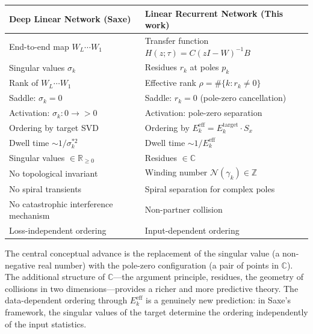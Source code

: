 \documentclass[11pt,a4paper]{article}
\theoremstyle{definition}
\newcommand{\C}{\mathbb{C}}
\newcommand{\R}{\mathbb{R}}
\newcommand{\Z}{\mathbb{Z}}
\newcommand{\cN}{\mathcal{N}}
\begin{document}
\medskip
\begin{center}
\renewcommand{\arraystretch}{1.4}
\begin{tabular}{@{}p{}p{}@{}}
\hline
\textbf{Deep Linear Network (Saxe)} &
\textbf{Linear Recurrent Network (This work)} \\
\hline
End-to-end map $W_L\cdots W_1$ &
Transfer function $H(z;\tau) = C(zI-W)^{-1}B$ \\
Singular values $\sigma_k$ &
Residues $r_k$ at poles $p_k$ \\
Rank of $W_L\cdots W_1$ &
Effective rank $\rho = \#\{k:r_k\neq 0\}$ \\
Saddle: $\sigma_k = 0$ &
Saddle: $r_k = 0$ (pole-zero cancellation) \\
Activation: $\sigma_k: 0 \to {>}0$ &
Activation: pole-zero separation \\
Ordering by target SVD &
Ordering by $E_k^{\mathrm{eff}} = E_k^{\mathrm{target}}\cdot S_x$ \\
Dwell time $\sim 1/\sigma_k^{*2}$ &
Dwell time $\sim 1/E_k^{\mathrm{eff}}$ \\
Singular values $\in \R_{\ge 0}$ &
Residues $\in \C$ \\
No topological invariant &
Winding number $\cN(\gamma_k) \in \Z$ \\
No spiral transients &
Spiral separation for complex poles \\
No catastrophic interference mechanism &
Non-partner collision \\
Loss-independent ordering &
Input-dependent ordering \\
\hline
\end{tabular}
\end{center}

\medskip

\noindent
The central conceptual advance is the replacement of the singular
value (a non-negative real number) with the pole-zero configuration
(a pair of points in $\C$). The additional structure of
$\C$---the argument principle, residues, the geometry of
collisions in two dimensions---provides a richer and more
predictive theory. The data-dependent ordering through
$E_k^{\mathrm{eff}}$ is a genuinely new prediction: in
Saxe's framework, the singular values of the target determine
the ordering independently of the input statistics.
\end{document}
